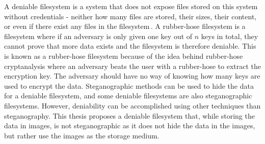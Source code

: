 \label{sec:rubber_hose}
A deniable filesystem is a system that does not expose files stored on this system without credentials - neither how many files are stored, their sizes, their content, or even if there exist any files in the filesystem\,\cite{andersonSteganographicFileSystem1998}. A \mbox{rubber-hose} filesystem is a filesystem where if an adversary is only given one key out of $n$ keys in total, they cannot prove that more data exists and the filesystem is therefore deniable. This is known as a \mbox{rubber-hose} filesystem because of the idea behind \mbox{rubber-hose} cryptanalysis where an adversary beats the user with a \mbox{rubber-hose} to extract the encryption key. The adversary should have no way of knowing how many keys are used to encrypt the data. Steganographic methods can be used to hide the data for a deniable filesystem, and some deniable filesystems are also steganographic filesystems. However, deniability can be accomplished using other techniques than steganography. This thesis proposes a deniable filesystem that, while storing the data in images, is not steganographic as it does not hide the data in the images, but rather use the images as the storage medium.